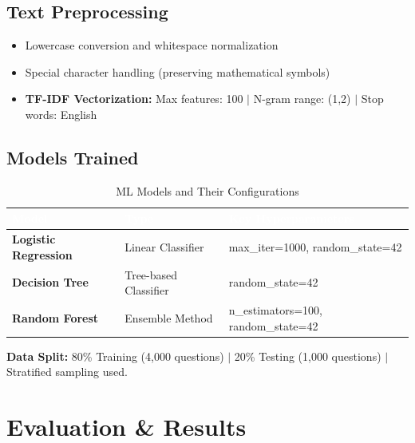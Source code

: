 \documentclass[12pt,a4paper]{article}
\begin{document}
\subsection{Text Preprocessing}

\begin{itemize}[leftmargin=1.5em, itemsep=3pt]
  \item Lowercase conversion and whitespace normalization
  \item Special character handling (preserving mathematical symbols)
  \item \textbf{TF-IDF Vectorization:} Max features: 100 $\mid$ N-gram range: (1,2) $\mid$ Stop words: English
\end{itemize}

\subsection{Models Trained}

\begin{table}[H]
\centering
\begin{tabular}{|L{4cm}|L{3.5cm}|L{5cm}|}
\hline
{}
\textcolor{white}{\textbf{Model}} &
\textcolor{white}{\textbf{Type}} &
\textcolor{white}{\textbf{Key Hyperparameters}} \\
\hline
\textbf{Logistic Regression} & Linear Classifier & max\_iter=1000, random\_state=42 \\
\hline
{}
\textbf{Decision Tree} & Tree-based Classifier & random\_state=42 \\
\hline
\textbf{Random Forest} & Ensemble Method & n\_estimators=100, random\_state=42 \\
\hline
\end{tabular}
\caption{ML Models and Their Configurations}
\end{table}

\vspace{0.4em}
\begin{summarybox}
\textbf{Data Split:} 80\% Training (4,000 questions) $\mid$ 20\% Testing (1,000 questions) $\mid$
Stratified sampling used.
\end{summarybox}

\section{Evaluation \& Results}
\end{document}
